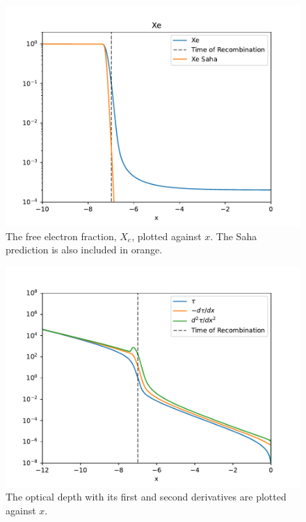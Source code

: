 \documentclass{aa}
\begin{document}
\begin{figure}[h!]
   \includegraphics[scale=0.5]{../figures/milestone2/X_e.pdf}
   \caption{The free electron fraction, $X_e$, plotted against $x$. The Saha prediction is also included in orange.}\label{fig:M2:X_e}
\end{figure}

\begin{figure}[h!]
   \includegraphics[scale=0.5]{../figures/milestone2/taus.pdf}
   \caption{The optical depth with its first and second derivatives are plotted against $x$.}\label{fig:M2:taus}
\end{figure}
\end{document}
